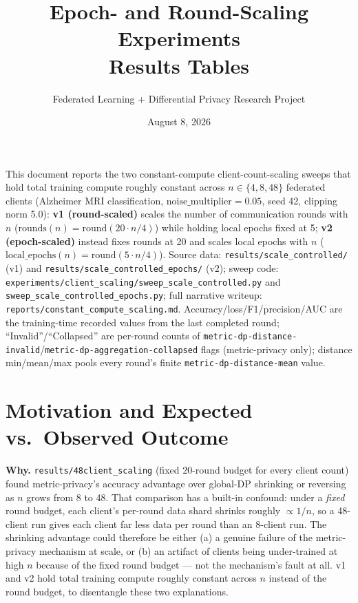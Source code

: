 \documentclass[11pt]{article}
\title{\textbf{Epoch- and Round-Scaling Experiments}\\[0.2em]
\large Results Tables}
\author{Federated Learning + Differential Privacy Research Project}
\date{August 8, 2026}
\newcommand{\code}[1]{\texttt{#1}}
\begin{document}
\maketitle

\noindent
This document reports the two constant-compute client-count-scaling sweeps that hold total
training compute roughly constant across $n \in \{4, 8, 48\}$ federated clients
(Alzheimer MRI classification, $\text{noise\_multiplier}=0.05$, seed 42, clipping norm 5.0):
\textbf{v1 (round-scaled)} scales the number of communication rounds with $n$
($\text{rounds}(n) = \text{round}(20 \cdot n / 4)$) while holding local epochs fixed at 5;
\textbf{v2 (epoch-scaled)} instead fixes rounds at 20 and scales local epochs with $n$
($\text{local\_epochs}(n) = \text{round}(5 \cdot n / 4)$). Source data:
\code{results/scale\_controlled/} (v1) and \code{results/scale\_controlled\_epochs/} (v2); sweep
code: \code{experiments/client\_scaling/sweep\_scale\_controlled.py} and
\code{sweep\_scale\_controlled\_epochs.py}; full narrative writeup:
\code{reports/constant\_compute\_scaling.md}. Accuracy/loss/F1/precision/AUC are the
training-time recorded values from the last completed round; ``Invalid''/``Collapsed'' are
per-round counts of \code{metric-dp-distance-invalid}/\code{metric-dp-aggregation-collapsed}
flags (metric-privacy only); distance min/mean/max pools every round's finite
\code{metric-dp-distance-mean} value.

\section*{Motivation and Expected vs.\ Observed Outcome}

\noindent \textbf{Why.} \code{results/48client\_scaling} (fixed 20-round budget for every client
count) found metric-privacy's accuracy advantage over global-DP shrinking or reversing as $n$ grows
from 8 to 48. That comparison has a built-in confound: under a \emph{fixed} round budget, each
client's per-round data shard shrinks roughly $\propto 1/n$, so a 48-client run gives each client
far less data per round than an 8-client run. The shrinking advantage could therefore be either
(a) a genuine failure of the metric-privacy mechanism at scale, or (b) an artifact of clients being
under-trained at high $n$ because of the fixed round budget --- not the mechanism's fault at all.
v1 and v2 hold total training compute roughly constant across $n$ instead of the round budget, to
disentangle these two explanations.
\end{document}
